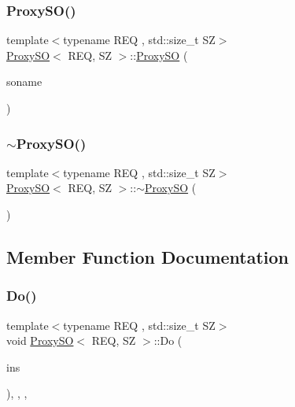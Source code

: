 \subsubsection{\texorpdfstring{Proxy\+S\+O()}{ProxySO()}}
{\footnotesize\ttfamily template$<$typename R\+EQ , std\+::size\+\_\+t SZ$>$ \\
\hyperlink{classProxySO}{Proxy\+SO}$<$ R\+EQ, SZ $>$\+::\hyperlink{classProxySO}{Proxy\+SO} (\begin{DoxyParamCaption}\item[{std\+::string}]{soname }\end{DoxyParamCaption})\hspace{0.3cm}{\ttfamily [inline]}}

\mbox{\label{classProxySO_acfe42e6a280ffe394926d16ddd13c3d2}} 
\subsubsection{\texorpdfstring{$\sim$\+Proxy\+S\+O()}{~ProxySO()}}
{\footnotesize\ttfamily template$<$typename R\+EQ , std\+::size\+\_\+t SZ$>$ \\
\hyperlink{classProxySO}{Proxy\+SO}$<$ R\+EQ, SZ $>$\+::$\sim$\hyperlink{classProxySO}{Proxy\+SO} (\begin{DoxyParamCaption}{ }\end{DoxyParamCaption})\hspace{0.3cm}{\ttfamily [inline]}}



\subsection{Member Function Documentation}
\mbox{\label{classProxySO_aea9532d196e05f80b2dd0de425df711f}} 
\subsubsection{\texorpdfstring{Do()}{Do()}}
{\footnotesize\ttfamily template$<$typename R\+EQ , std\+::size\+\_\+t SZ$>$ \\
void \hyperlink{classProxySO}{Proxy\+SO}$<$ R\+EQ, SZ $>$\+::Do (\begin{DoxyParamCaption}\item[{R\+EQ \&}]{ins }\end{DoxyParamCaption})\hspace{0.3cm}{\ttfamily [inline]}, {\ttfamily [override]}, {\ttfamily [private]}, {\ttfamily [virtual]}}



